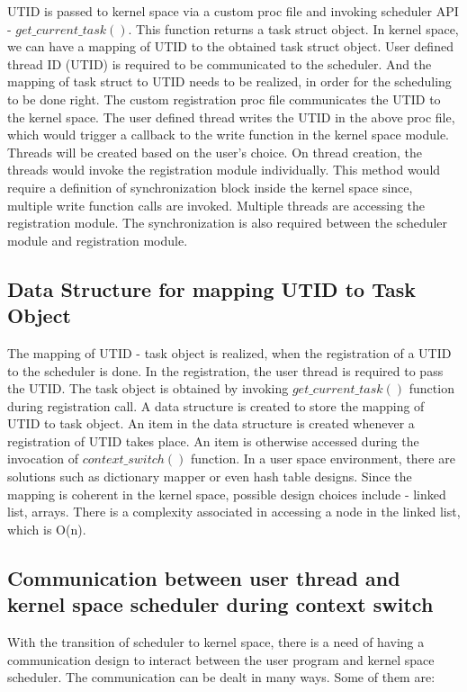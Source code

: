 UTID  is passed to kernel space via a custom proc file and invoking scheduler API - $get\_current\_task()$. 
This function returns a task struct object. 
In kernel space, we can have a mapping of UTID to the obtained task struct object. 
User defined thread ID (UTID) is required to be communicated to the scheduler. 
And the mapping of task struct to UTID needs to be realized, in order for the scheduling to be done right. 
The custom registration proc file communicates the UTID to the kernel space. 
The user defined thread writes the UTID in the above proc file, which would trigger a callback to the write function in the kernel space module. 
Threads will be created based on the user's choice. 
On thread creation, the threads would invoke the registration module individually. 
This method would require a definition of synchronization block inside the kernel space since, multiple write function calls are invoked. 
Multiple threads are accessing the registration module. 
The synchronization is also required between the scheduler module and registration module.


\subsection{Data Structure for mapping UTID to Task Object}

The mapping of UTID - task object is realized, when the registration of a UTID to the scheduler is done. 
In the registration, the user thread is required to pass the UTID. 
The task object is obtained by invoking $get\_current\_task()$ function during registration call. 
A data structure is created to store the mapping of UTID to task object. 
An item in the data structure is created whenever a registration of UTID takes place. 
An item is otherwise accessed during the invocation of $context\_switch()$ function. 
In a user space environment, there are solutions such as dictionary mapper or even hash table designs. 
Since the mapping is coherent in the kernel space, possible design choices include - linked list, arrays. 
There is a complexity associated in accessing a node in the linked list, which is O(n).

\subsection{Communication between user thread and kernel space scheduler during context switch} 

With the transition of scheduler to kernel space, there is a need of having a communication design to interact between the user program and kernel space scheduler. 
The communication can be dealt in many ways\cite{commkernelanduser}. 
Some of them are:

